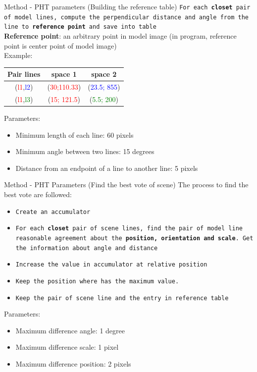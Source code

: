 \documentclass{beamer}
\begin{document}
\begin{frame}{Method - PHT parameters (Building the reference table)}
	\texttt{For each \textbf{closet} pair of model lines, compute the perpendicular distance and angle from the line to \textbf{reference point} and save into table}\\[0.3cm]
	\textbf{Reference point}: an arbitrary point in model image (in program, reference point is center point of model image)\\[0.3cm]
	Example:
	\begin{center}
		\begin{tabular}{|c|c|c|}
		\hline
			Pair lines & space 1 & space 2 \\ \hline
			(\textcolor{red}{l1},\textcolor{blue}{l2}) & (\textcolor{red}{30;110.33}) & (\textcolor{blue}{23.5; 855})  \\ \hline
			(\textcolor{red}{l1},\textcolor{green}{l3}) & (\textcolor{red}{15; 121.5}) & (\textcolor{green}{5.5; 200})   \\ \hline
		\end{tabular}
	\end{center}
	Parameters:
	\begin{itemize}
		\item Minimum length of each line: 60 pixels
		\item Minimum angle between two lines: 15 degrees
		\item Distance from an endpoint of a line to another line: 5 pixels
	\end{itemize}
\end{frame}
\begin{frame}{Method - PHT Parameters (Find the best vote of scene)}
	The process to find the best vote are followed:
	\begin{itemize}
		\item \texttt{Create an accumulator}
		\item \texttt{For each \textbf{closet} pair of scene lines, find the pair of model line reasonable agreement about the \textbf{position, orientation and scale}. Get the information about angle and distance}
		\item \texttt{Increase the value in accumulator at relative position}
		\item \texttt{Keep the position where has the maximum value.}
		\item \texttt{Keep the pair of scene line and the entry in reference table}
	\end{itemize}
	Parameters:
	\begin{itemize}
		\item Maximum difference angle: 1 degree
		\item Maximum difference scale: 1 pixel
		\item Maximum difference position: 2 pixels
	\end{itemize}

\end{frame}
\end{document}
